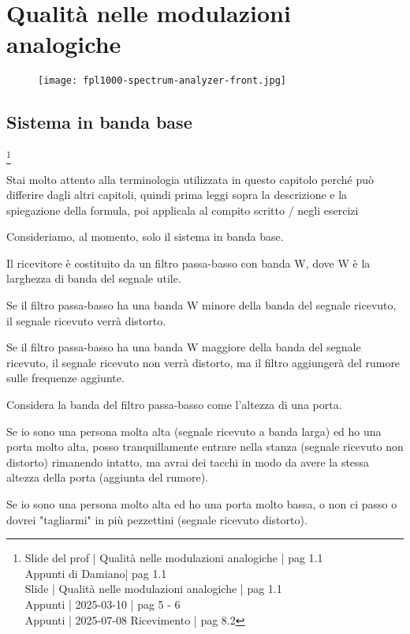 \chapter{Qualità nelle modulazioni analogiche}

\begin{figure}[h]
    \centering
    \texttt{[image: fpl1000-spectrum-analyzer-front.jpg]}
\end{figure}

\newpage 

\section{Sistema in banda base}
\footnote{Slide del prof | Qualità nelle modulazioni analogiche | pag 1.1 \\  
Appunti di Damiano| pag 1.1 \\
Slide | Qualità nelle modulazioni analogiche | pag 1.1 \\
Appunti | 2025-03-10 | pag 5 - 6 \\ 
Appunti | 2025-07-08 Ricevimento | pag 8.2} 

\begin{tcolorbox}
    Stai molto attento alla terminologia utilizzata in questo capitolo perché può differire dagli altri capitoli, 
    quindi prima leggi sopra la descrizione e la spiegazione della formula, poi applicala al compito scritto / negli esercizi
\end{tcolorbox}

Consideriamo, al momento, solo il sistema in banda base. \newline 

Il ricevitore è costituito da un filtro passa-basso con banda W, dove W è la larghezza di banda del segnale utile. \newline 

Se il filtro passa-basso ha una banda W minore della banda del segnale ricevuto, 
il segnale ricevuto verrà distorto. \newline 

Se il filtro passa-basso ha una banda W maggiore della banda del segnale ricevuto, 
il segnale ricevuto non verrà distorto, ma il filtro aggiungerà del rumore sulle frequenze aggiunte. \newline 

\begin{tcolorbox}
    Considera la banda del filtro passa-basso come l'altezza di una porta. \newline 

    Se io sono una persona molta alta (segnale ricevuto a banda larga) ed ho una porta molto alta, 
    posso tranquillamente entrare nella stanza (segnale ricevuto non distorto) rimanendo intatto, ma avrai dei tacchi in modo da avere la stessa altezza della porta (aggiunta del rumore). \newline 

    Se io sono una persona molto alta ed ho una porta molto bassa, o non ci passo o dovrei "tagliarmi" in più pezzettini (segnale ricevuto distorto).
\end{tcolorbox}

